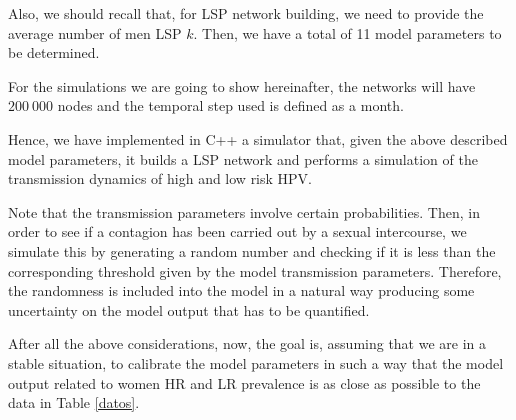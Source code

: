 Also, we should recall that, for LSP network building, we need to provide the average number of men LSP $k$. Then, we have a total of 11 model parameters to be determined.

For the simulations we are going to show hereinafter, the networks will have $200\ 000$ nodes and the temporal step used is defined as a month.

Hence, we have implemented in C++ a simulator that, given the above described model parameters, it builds a LSP network and performs a simulation of the transmission dynamics of high and low risk HPV. 

Note that the transmission parameters involve certain probabilities. Then, in order to see if a contagion has been carried out by a sexual intercourse, we simulate this by generating a random number and checking if it is less than the corresponding threshold given by the model transmission parameters. Therefore, the randomness is included into the model in a natural way producing some uncertainty on the model output that has to be quantified.

After all the above considerations, now, the goal is, assuming that we are in a stable situation, to calibrate the model parameters in such a way that the model output related to women HR and LR prevalence is as close as possible to the data in Table \ref{datos}.
